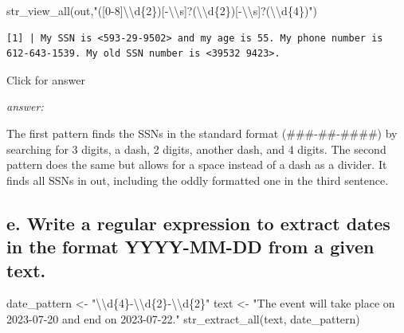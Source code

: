 \documentclass[
]{book}
\newenvironment{Shaded}{\begin{snugshade}}{\end{snugshade}}
\newcommand{\FunctionTok}[1]{\textcolor[rgb]{0.00,0.00,0.00}{#1}}
\newcommand{\NormalTok}[1]{#1}
\newcommand{\OtherTok}[1]{\textcolor[rgb]{0.56,0.35,0.01}{#1}}
\newcommand{\SpecialCharTok}[1]{\textcolor[rgb]{0.00,0.00,0.00}{#1}}
\newcommand{\StringTok}[1]{\textcolor[rgb]{0.31,0.60,0.02}{#1}}
\begin{document}
\begin{Shaded}
\begin{Highlighting}[]
\FunctionTok{str\_view\_all}\NormalTok{(out,}\StringTok{"([0{-}8]}\SpecialCharTok{\textbackslash{}\textbackslash{}}\StringTok{d\{2\})[{-}}\SpecialCharTok{\textbackslash{}\textbackslash{}}\StringTok{s]?(}\SpecialCharTok{\textbackslash{}\textbackslash{}}\StringTok{d\{2\})[{-}}\SpecialCharTok{\textbackslash{}\textbackslash{}}\StringTok{s]?(}\SpecialCharTok{\textbackslash{}\textbackslash{}}\StringTok{d\{4\})"}\NormalTok{)}
\end{Highlighting}
\end{Shaded}

\begin{verbatim}
[1] | My SSN is <593-29-9502> and my age is 55. My phone number is 612-643-1539. My old SSN number is <39532 9423>.
\end{verbatim}

Click for answer

\emph{answer:}

The first pattern finds the SSNs in the standard format (\#\#\#-\#\#-\#\#\#\#) by searching for 3 digits, a dash, 2 digits, another dash, and 4 digits. The second pattern does the same but allows for a space instead of a dash as a divider. It finds all SSNs in out, including the oddly formatted one in the third sentence.

\hypertarget{e.-write-a-regular-expression-to-extract-dates-in-the-format-yyyy-mm-dd-from-a-given-text.}{%
\subsection{e. Write a regular expression to extract dates in the format YYYY-MM-DD from a given text.}\label{e.-write-a-regular-expression-to-extract-dates-in-the-format-yyyy-mm-dd-from-a-given-text.}}

\begin{Shaded}
\begin{Highlighting}[]
\NormalTok{date\_pattern }\OtherTok{\textless{}{-}} \StringTok{"}\SpecialCharTok{\textbackslash{}\textbackslash{}}\StringTok{d\{4\}{-}}\SpecialCharTok{\textbackslash{}\textbackslash{}}\StringTok{d\{2\}{-}}\SpecialCharTok{\textbackslash{}\textbackslash{}}\StringTok{d\{2\}"}
\NormalTok{text }\OtherTok{\textless{}{-}} \StringTok{"The event will take place on 2023{-}07{-}20 and end on 2023{-}07{-}22."}
\FunctionTok{str\_extract\_all}\NormalTok{(text, date\_pattern)}
\end{Highlighting}
\end{Shaded}
\end{document}
